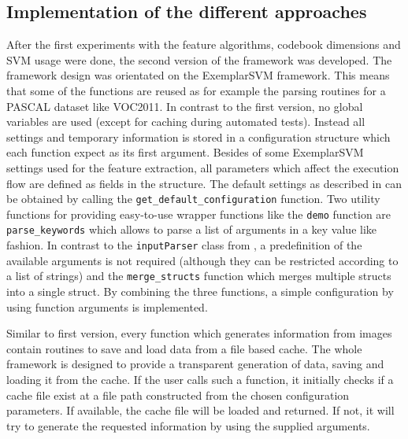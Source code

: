 \subsection{Implementation of the different approaches}

After the first experiments with the feature algorithms, codebook dimensions and \ac{SVM} usage were done, the second version of the framework was developed. The framework design was orientated on the ExemplarSVM framework. This means that some of the functions are reused as for example the parsing routines for a PASCAL dataset like \ac{VOC2011}. In contrast to the first version, no global variables are used (except for caching during automated tests). Instead all settings and temporary information is stored in a configuration structure which each function expect as its first argument. Besides of some ExemplarSVM settings used for the feature extraction, all parameters which affect the execution flow are defined as fields in the structure. The default settings as described in  can be obtained by calling the \verb|get_default_configuration| function. Two utility functions for providing easy-to-use wrapper functions like the \verb|demo| function are \verb|parse_keywords| which allows to parse a list of arguments in a key value like fashion. In contrast to the \verb|inputParser| class from \MATLAB, a predefinition of the available arguments is not required (although they can be restricted according to a list of strings) and the \verb|merge_structs| function which merges multiple structs into a single struct. By combining the three functions, a simple configuration by using function arguments is implemented.

Similar to first version, every function which generates information from images contain routines to save and load data from a file based cache. The whole framework is designed to provide a transparent generation of data, saving and loading it from the cache. If the user calls such a function, it initially checks if a cache file exist at a file path constructed from the chosen configuration parameters. If available, the cache file will be loaded and returned. If not, it will try to generate the requested information by using the supplied arguments.

